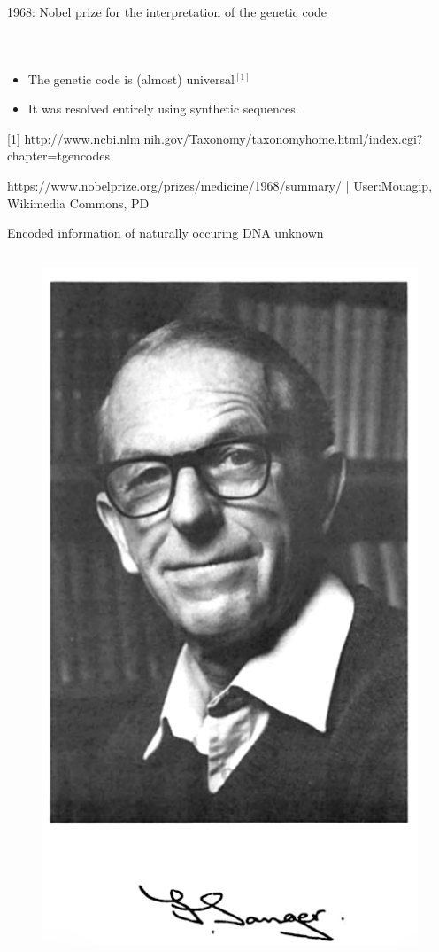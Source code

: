 \documentclass[10pt]{beamer}
\newcommand{\credit}[1]{{\vspace{\fill} \par \raggedleft \scriptsize \mdseries \color{mDarkBrown} #1 \par}}
\begin{document}
\begin{frame}{1968: Nobel prize for the interpretation of the genetic code}
\begin{columns}[T,onlytextwidth]
\begin{figure}
		\end{figure}
	\end{columns}
	\begin{itemize}
		\item The genetic code is (almost) universal$^{[1]}$ 
		\item It was resolved entirely using synthetic sequences.
	\end{itemize}
	 \par {\scriptsize [1] http://www.ncbi.nlm.nih.gov/Taxonomy/taxonomyhome.html/index.cgi?chapter=tgencodes}
	\credit{https://www.nobelprize.org/prizes/medicine/1968/summary/ | User:Mouagip, Wikimedia Commons, PD}
\end{frame}

\begin{frame}{Encoded information of naturally occuring DNA unknown}
	\begin{columns}[T,onlytextwidth]
		\begin{figure}
			\includegraphics[width=\textwidth]{./figures/sanger.png}

\end{figure}
\end{columns}
\end{frame}
\end{document}
